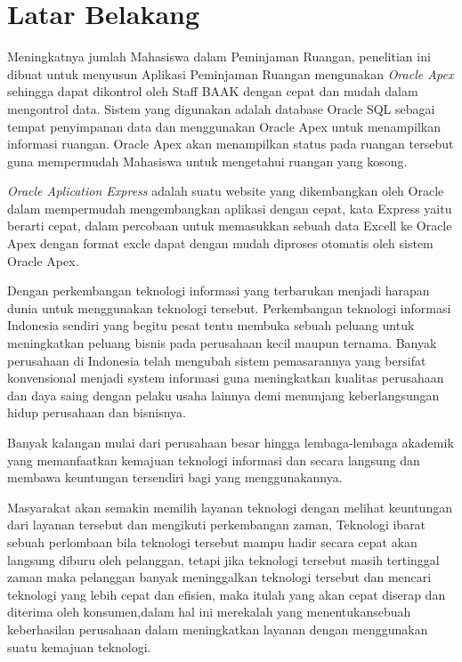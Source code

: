 \section{Latar Belakang}
Meningkatnya jumlah Mahasiswa dalam Peminjaman Ruangan, penelitian ini dibuat untuk menyusun Aplikasi Peminjaman Ruangan mengunakan \textit{Oracle Apex} sehingga dapat dikontrol oleh Staff BAAK dengan cepat  dan mudah dalam mengontrol data. Sistem yang digunakan adalah database Oracle SQL sebagai tempat penyimpanan data dan menggunakan Oracle Apex untuk menampilkan informasi ruangan. Oracle Apex akan menampilkan status pada ruangan tersebut guna mempermudah Mahasiswa untuk mengetahui ruangan yang kosong.

\par \textit{Oracle Aplication Express} adalah suatu website yang dikembangkan oleh Oracle dalam mempermudah mengembangkan aplikasi dengan cepat, kata Express yaitu berarti cepat, dalam percobaan untuk memasukkan sebuah data Excell ke Oracle Apex dengan format excle dapat dengan mudah diproses otomatis oleh sistem Oracle Apex.

\par Dengan perkembangan teknologi informasi yang terbarukan menjadi harapan dunia untuk menggunakan teknologi tersebut. Perkembangan teknologi informasi Indonesia sendiri yang begitu pesat tentu membuka sebuah peluang untuk meningkatkan peluang bisnis pada perusahaan kecil maupun ternama. Banyak perusahaan di Indonesia telah mengubah sistem pemasarannya yang bersifat konvensional menjadi system informasi guna meningkatkan kualitas perusahaan dan daya saing dengan pelaku usaha lainnya demi menunjang keberlangsungan hidup perusahaan dan bisnisnya.

\par Banyak kalangan mulai dari perusahaan besar hingga lembaga-lembaga akademik yang memanfaatkan kemajuan teknologi informasi dan secara langsung dan membawa keuntungan tersendiri bagi yang menggunakannya.

\par Masyarakat akan semakin memilih layanan teknologi dengan melihat keuntungan dari layanan tersebut dan mengikuti perkembangan zaman, Teknologi ibarat sebuah perlombaan bila teknologi tersebut mampu hadir secara cepat akan langsung diburu oleh pelanggan, tetapi jika teknologi tersebut masih tertinggal zaman maka pelanggan banyak meninggalkan teknologi tersebut dan mencari teknologi yang lebih cepat dan efisien, maka itulah yang akan cepat diserap dan diterima oleh konsumen,dalam hal ini merekalah yang menentukansebuah keberhasilan perusahaan dalam meningkatkan layanan dengan menggunakan suatu kemajuan teknologi. 

